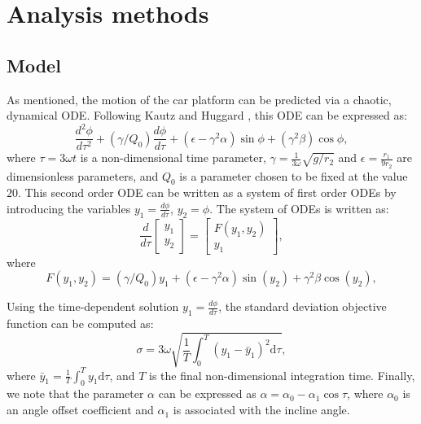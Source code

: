 \documentclass[11pt]{article}
\begin{document}
\section{Analysis methods}

\subsection{Model}

As mentioned, the motion of the car platform can be
predicted via a chaotic, dynamical ODE. Following
Kautz and Huggard \cite{chaos}, this ODE can be
expressed as:
%
\begin{equation}
\frac{d^2 \phi}{d \tau^2} +
(\gamma / Q_0) \frac{d \phi} {d \tau} +
(\epsilon - \gamma^2 \alpha) \sin \phi +
(\gamma^2 \beta) \cos \phi,
\end{equation}
%
where $\tau = 3 \omega t$ is a non-dimensional time
parameter, $\gamma = \frac{1}{3 \omega} \sqrt{g/r_2}$
and $\epsilon = \frac{r_1}{9 r_2}$ are dimensionless
parameters, and $Q_0$ is a parameter chosen to be fixed
at the value $20$. This second order ODE can be written
as a system of first order ODEs by introducing the
variables $y_1 = \frac{d \phi}{d \tau}$, $y_2 = \phi$.
The system of ODEs is written as:
%
\begin{equation}
\frac{d}{d \tau}
\begin{bmatrix}
y_1\\
y_2
\end{bmatrix}
=
\begin{bmatrix}
F(y_1, y_2) \\
y_1
\end{bmatrix},
\end{equation}
%
where
%
\begin{equation}
F(y_1, y_2) =
(\gamma / Q_0) y_1 +
(\epsilon - \gamma^2 \alpha) \sin (y_2) +
\gamma^2 \beta \cos(y_2),
\end{equation}

Using the time-dependent solution
$y_1 = \frac{d \phi} {d \tau}$,
the standard deviation objective function can be
computed as:
%
\begin{equation}
\sigma = 3 \omega
\sqrt{ \frac{1}{T} \int_0^T (y_1 - \bar{y}_1)^2 \text{d} \tau},
\label{eq:obj}
\end{equation}
%
where $\bar{y}_1 = \frac{1}{T} \int_0^T y_1 \text{d} \tau$,
and $T$ is the final non-dimensional integration time.
Finally, we note that the parameter $\alpha$ can be
expressed as $\alpha = \alpha_0 - \alpha_1 \cos \tau$,
where $\alpha_0$ is an angle offset coefficient
and $\alpha_1$ is associated with the incline angle.
\end{document}
